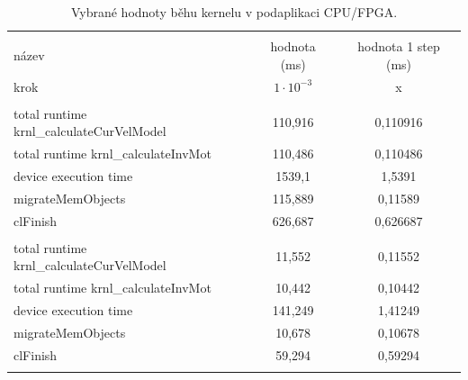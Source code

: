 \documentclass[a4paper, twoside, 11pt]{article}
\begin{document}
	\begin{table}[H]
		\centering
		\caption{Vybrané hodnoty běhu kernelu v podaplikaci CPU/FPGA.}
		\vspace*{0.15cm}
		\begin{tabular}{!{\vrule width 2pt} l | c | c !{\vrule width 2pt}}
		\\
		název & hodnota (ms) & hodnota 1 step (ms)\\
		krok & $1\cdot 10^{-3}$ & x\\ 
		\\
		total runtime krnl\_calculateCurVelModel & 110,916 & 0,110916\\ \hline
		total runtime krnl\_calculateInvMot & 110,486 & 0,110486\\ \hline
		device execution time& 1539,1 & 1,5391\\ \hline
		migrateMemObjects & 115,889 & 0,11589\\ \hline
		clFinish & 626,687 & 0,626687\\ 
		\\ 
		total runtime krnl\_calculateCurVelModel & 11,552 & 0,11552\\ \hline
		total runtime krnl\_calculateInvMot & 10,442 & 0,10442\\ \hline
		device execution time& 141,249 & 1,41249\\ \hline
		migrateMemObjects & 10,678 & 0,10678\\ \hline
		clFinish & 59,294 & 0,59294\\ 
			\end{tabular}
			\label{tab:vybrane-hodnoty-behu-kernelu-v-podaplikaci-cpu-fpga}
	\end{table}
\end{document}
